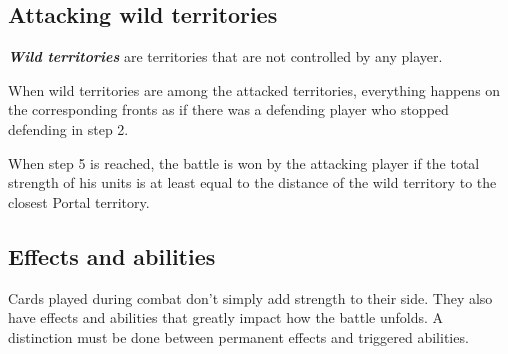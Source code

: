 \documentclass[a4paper]{article}
\begin{document}
  \subsection{Attacking wild territories}
    
    \textbf{\textit{Wild territories}} are territories that are not controlled by any
    player.
    
    When wild territories are among the attacked territories,
    everything happens on the corresponding fronts as if there was a defending player
    who stopped defending in step 2.
    
    When step 5 is reached, the battle is won by the attacking player if the total
    strength of his units is at least equal to the distance of the wild territory
    to the closest Portal territory.


\subsection{Effects and abilities}

    Cards played during combat don't simply add strength to their side.
    They also have effects and abilities that greatly impact how the battle unfolds.
    A distinction must be done between permanent effects and triggered abilities.
\end{document}
